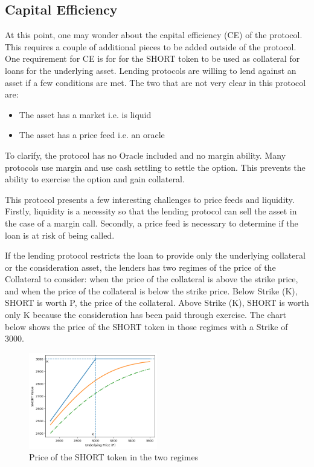 \subsection{Capital Efficiency}

At this point, one may wonder about the capital efficiency (CE) of the protocol. 
This requires a couple of additional pieces to be added outside of the protocol.
One requirement for CE is for for the SHORT token to be used as collateral for loans for the underlying asset.
Lending protocols are willing to lend against an asset if a few conditions are met. 
The two that are not very clear in this protocol are:
\begin{itemize}
  \setlength{\itemsep}{0pt}
  \setlength{\parskip}{0pt}
  \item The asset has a market i.e. is liquid
  \item The asset has a price feed i.e. an oracle
\end{itemize}


To clarify, the protocol has no Oracle included and no margin ability. 
Many protocols use margin and use cash settling to settle the option.
This prevents the ability to exercise the option and gain collateral.

This protocol presents a few interesting challenges to price feeds and liquidity. 
Firstly, liquidity is a necessity so that the lending protocol can sell the asset in the case of a margin call.
Secondly, a price feed is necessary to determine if the loan is at risk of being called.

If the lending protocol restricts the loan to provide only the underlying collateral or the consideration asset,
the lenders has two regimes of the price of the Collateral to consider: 
when the price of the collateral is above the strike price, and when the price of the collateral is below the strike price.
Below Strike (K), SHORT is worth P, the price of the collateral. 
Above Strike (K), SHORT is worth only K because the consideration has been paid through exercise.
The chart below shows the price of the SHORT token in those regimes with a Strike of 3000.
\begin{figure}[h]
  \centering
  \includegraphics[width=0.5\textwidth]{short_price.png}
  \caption{Price of the SHORT token in the two regimes}
  \label{fig:short_price}
\end{figure}

